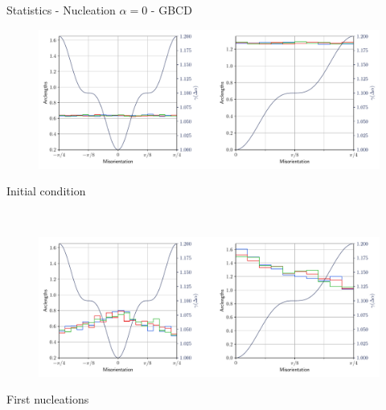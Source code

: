 \documentclass[usenames,dvipsnames]{beamer}
\begin{document}
\begin{frame}{Statistics - Nucleation $\alpha = 0$ - GBCD}
\small
    \begin{minipage}{\textwidth}
    \centering
    \vspace{-0.5em}
    \begin{figure}
    \centering
    \includegraphics[scale=0.33]{figures/stored_energy/SE/gbcd/000000_nuclconstant_set.pdf}
    \end{figure}
    \vspace{-2em}
    Initial condition
    \end{minipage}\\
    \begin{minipage}{\textwidth}
    \centering
    \begin{figure}
    \centering
    \includegraphics[scale=0.33]{figures/stored_energy/SE/gbcd/000070_nuclconstant_set.pdf}
    \end{figure}
    \vspace{-2em}
    First nucleations
    \end{minipage}
\end{frame}
\end{document}
